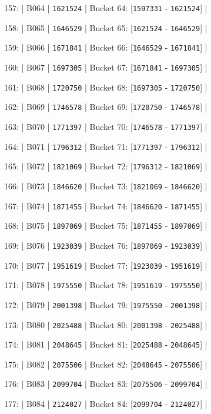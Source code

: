 \documentclass[11pt,a4paper]{article}
\begin{document}
{{{157: | B064 | \texttt{1621524} | Bucket 64: [\texttt{1597331} - \texttt{1621524}] |

158: | B065 | \texttt{1646529} | Bucket 65: [\texttt{1621524} - \texttt{1646529}] |

159: | B066 | \texttt{1671841} | Bucket 66: [\texttt{1646529} - \texttt{1671841}] |

160: | B067 | \texttt{1697305} | Bucket 67: [\texttt{1671841} - \texttt{1697305}] |

161: | B068 | \texttt{1720750} | Bucket 68: [\texttt{1697305} - \texttt{1720750}] |

162: | B069 | \texttt{1746578} | Bucket 69: [\texttt{1720750} - \texttt{1746578}] |

163: | B070 | \texttt{1771397} | Bucket 70: [\texttt{1746578} - \texttt{1771397}] |

164: | B071 | \texttt{1796312} | Bucket 71: [\texttt{1771397} - \texttt{1796312}] |

165: | B072 | \texttt{1821069} | Bucket 72: [\texttt{1796312} - \texttt{1821069}] |

166: | B073 | \texttt{1846620} | Bucket 73: [\texttt{1821069} - \texttt{1846620}] |

167: | B074 | \texttt{1871455} | Bucket 74: [\texttt{1846620} - \texttt{1871455}] |

168: | B075 | \texttt{1897069} | Bucket 75: [\texttt{1871455} - \texttt{1897069}] |

169: | B076 | \texttt{1923039} | Bucket 76: [\texttt{1897069} - \texttt{1923039}] |

170: | B077 | \texttt{1951619} | Bucket 77: [\texttt{1923039} - \texttt{1951619}] |

171: | B078 | \texttt{1975550} | Bucket 78: [\texttt{1951619} - \texttt{1975550}] |

172: | B079 | \texttt{2001398} | Bucket 79: [\texttt{1975550} - \texttt{2001398}] |

173: | B080 | \texttt{2025488} | Bucket 80: [\texttt{2001398} - \texttt{2025488}] |

174: | B081 | \texttt{2048645} | Bucket 81: [\texttt{2025488} - \texttt{2048645}] |

175: | B082 | \texttt{2075506} | Bucket 82: [\texttt{2048645} - \texttt{2075506}] |

176: | B083 | \texttt{2099704} | Bucket 83: [\texttt{2075506} - \texttt{2099704}] |

177: | B084 | \texttt{2124027} | Bucket 84: [\texttt{2099704} - \texttt{2124027}] |

}}}
\end{document}
